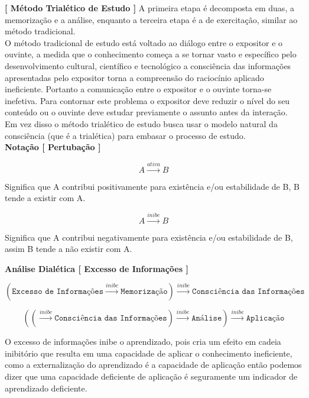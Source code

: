\documentclass[10pt,a4paper]{report}
\begin{document}
\textbf{[ Método Trialético de Estudo ]} A primeira etapa é decomposta em duas, a memorização e a análise, enquanto a terceira etapa é a de exercitação, similar ao método tradicional.\\

O método tradicional de estudo está voltado ao diálogo entre o expositor e o ouvinte, a medida que o conhecimento começa a se tornar vasto e específico pelo desenvolvimento cultural, científico e tecnológico a consciência das informações apresentadas pelo expositor torna a compreensão do raciocínio aplicado ineficiente. Portanto a comunicação entre o expositor e o ouvinte torna-se inefetiva. Para contornar este problema o expositor deve reduzir o nível do seu conteúdo ou o ouvinte deve estudar previamente o assunto antes da interação. Em vez disso o método trialético de estudo busca usar o modelo natural da consciência (que é a trialética) para embasar o processo de estudo. \\

\textbf{Notação [ Pertubação ]} 

$$ A \overset{ativa}{\rightarrow} B $$

Significa que A contribui positivamente para existência e/ou estabilidade de B, B tende a existir com A.

$$ A \overset{inibe}{\rightarrow} B $$

Significa que A contribui negativamente para existência e/ou estabilidade de B, assim B tende a não existir com A.

\hspace{\baselineskip}

\textbf{Análise Dialética [ Excesso de Informações ]}

$$  (\texttt{Excesso de Informações} \overset{inibe}{\rightarrow} \texttt{Memorização} ) \overset{inibe}{\rightarrow} \texttt{Consciência das Informações}  $$

$$ ( (\overset{inibe}{\rightarrow} \texttt{Consciência das Informações}) \overset{inibe}{\rightarrow} \texttt{Análise} ) \overset{inibe}{\rightarrow} \texttt{Aplicação}  $$

\hrulefill

O excesso de informações inibe o aprendizado, pois cria um efeito em cadeia inibitório que resulta em uma capacidade de aplicar o conhecimento ineficiente, como a externalização do aprendizado é a capacidade de aplicação então podemos dizer que uma capacidade deficiente de aplicação é seguramente um indicador de aprendizado deficiente.\\
\end{document}
